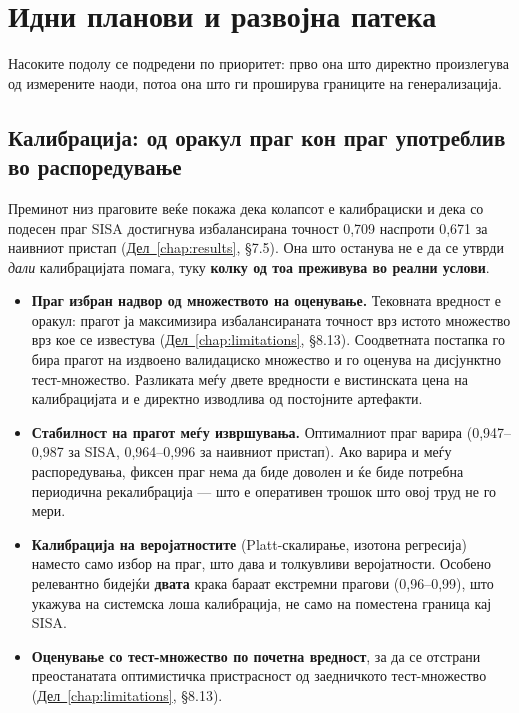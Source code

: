 \chapter{Идни планови и развојна патека}
\label{chap:future}

Насоките подолу се подредени по приоритет: прво она што директно произлегува од измерените
наоди, потоа она што ги проширува границите на генерализација.

\section{Калибрација: од оракул праг кон праг употреблив во распоредување}

Преминот низ праговите веќе покажа дека колапсот е калибрациски и дека со подесен праг SISA
достигнува избалансирана точност 0,709 наспроти 0,671 за наивниот пристап
(\hyperref[chap:results]{Дел~\ref*{chap:results}}, §7.5). Она што останува не е да се утврди
\emph{дали} калибрацијата помага, туку \textbf{колку од тоа преживува во реални услови}.

\begin{itemize}
  \item \textbf{Праг избран надвор од множеството на оценување.} Тековната вредност е оракул: прагот
  ја максимизира избалансираната точност врз истото множество врз кое се известува
  (\hyperref[chap:limitations]{Дел~\ref*{chap:limitations}}, §8.13). Соодветната постапка го
  бира прагот на издвоено валидациско множество и го оценува на дисјунктно тест-множество.
  Разликата меѓу двете вредности е вистинската цена на калибрацијата и е директно изводлива
  од постојните артефакти.
  \item \textbf{Стабилност на прагот меѓу извршувања.} Оптималниот праг варира (0,947--0,987 за
  SISA, 0,964--0,996 за наивниот пристап). Ако варира и меѓу распоредувања, фиксен праг нема
  да биде доволен и ќе биде потребна периодична рекалибрација --- што е оперативен трошок што
  овој труд не го мери.
  \item \textbf{Калибрација на веројатностите} (Platt-скалирање, изотона регресија) наместо само
  избор на праг, што дава и толкувливи веројатности. Особено релевантно бидејќи \textbf{двата}
  крака бараат екстремни прагови (0,96--0,99), што укажува на системска лоша калибрација, не
  само на поместена граница кај SISA.
  \item \textbf{Оценување со тест-множество по почетна вредност}, за да се отстрани преостанатата
  оптимистичка пристрасност од заедничкото тест-множество
  (\hyperref[chap:limitations]{Дел~\ref*{chap:limitations}}, §8.13).
\end{itemize}

